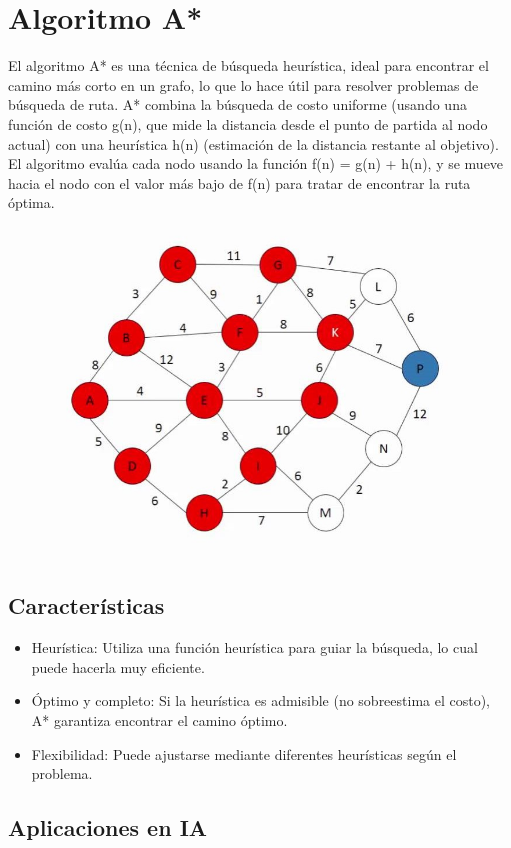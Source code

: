 \documentclass[12pt]{article}
\begin{document}
\clearpage

\section{Algoritmo A*}

El algoritmo A* es una técnica de búsqueda heurística, ideal para encontrar el camino más corto en un grafo, lo que lo hace útil para resolver problemas de búsqueda de ruta. 
A* combina la búsqueda de costo uniforme (usando una función de costo g(n), que mide la distancia desde el punto de partida al nodo actual) con una heurística h(n) 
(estimación de la distancia restante al objetivo). El algoritmo evalúa cada nodo usando la función f(n) = g(n) + h(n), y se mueve hacia el nodo con el valor más bajo de f(n) 
para tratar de encontrar la ruta óptima.

\begin{figure}[h!]
    \centering
    \includegraphics[width=.5\textwidth]{grafo.jpg}
    \label{fig:my_label}
\end{figure}

\subsection{Características}

\begin{itemize}
    \item Heurística: Utiliza una función heurística para guiar la búsqueda, lo cual puede hacerla muy eficiente.
    \item Óptimo y completo: Si la heurística es admisible (no sobreestima el costo), A* garantiza encontrar el camino óptimo.
    \item Flexibilidad: Puede ajustarse mediante diferentes heurísticas según el problema.
\end{itemize}

\subsection{Aplicaciones en IA}
\end{document}
